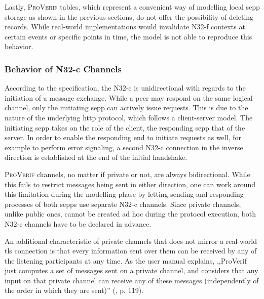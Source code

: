Lastly, \textsc{ProVerif} tables, which represent a convenient way of modelling local \gls{sepp} storage as shown in the previous sections, do not offer the possibility of deleting records.
While real-world implementations would invalidate N32-f contexts at certain events or specific points in time, the model is not able to reproduce this behavior.

\subsubsection{Behavior of N32-c Channels}

According to the specification, the N32-c is unidirectional with regards to the initiation of a message exchange.
While a peer may respond on the same logical channel, only the initiating \gls{sepp} can actively issue requests.
This is due to the nature of the underlying \gls{http} protocol, which follows a client-server model.
The initiating \gls{sepp} takes on the role of the client, the responding \gls{sepp} that of the server.
In order to enable the responding end to initiate requests as well, for example to perform error signaling, a second N32-c connection in the inverse direction is established at the end of the initial handshake.

\textsc{ProVerif} channels, no matter if private or not, are always bidirectional.
While this fails to restrict messages being sent in either direction, one can work around this limitation during the modelling phase by letting sending and responding processes of both \glspl{sepp} use separate N32-c channels.
Since private channels, unlike public ones, cannot be created ad hoc during the protocol execution, both N32-c channels have to be declared in advance.

An additional characteristic of private channels that does not mirror a real-world \gls{tls} connection is that every information sent over them can be received by any of the listening participants at any time.
As the user manual explains, ,,ProVerif just computes a set of messages sent on a private channel, and considers that any input on that private channel can receive any of these messages (independently of the order in which
they are sent)'' (\cite{blanchet2020proverif}, p. 119).
